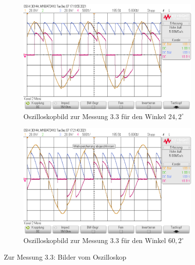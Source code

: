\documentclass{article}
\begin{document}
\begin{figure}[h]
  \centering
  \begin{subfigure}{.45\textwidth}
    \centering
    \includegraphics[width=\linewidth]{../assets/images/GEP2/32_Winkel242.png}
    \caption{Oszilloskopbild zur Messung 3.3 für den Winkel $24,2^{\circ}$}
  \end{subfigure}
  \begin{subfigure}{.45\textwidth}
    \centering
    \includegraphics[width=\linewidth]{../assets/images/GEP2/32_Winkel602.png}
    \caption{Oszilloskopbild zur Messung 3.3 für den Winkel $60,2^{\circ}$}
  \end{subfigure}
  \label{fig:31_242}
  \caption{Zur Messung 3.3: Bilder vom Oszilloskop}
\end{figure}
\end{document}
